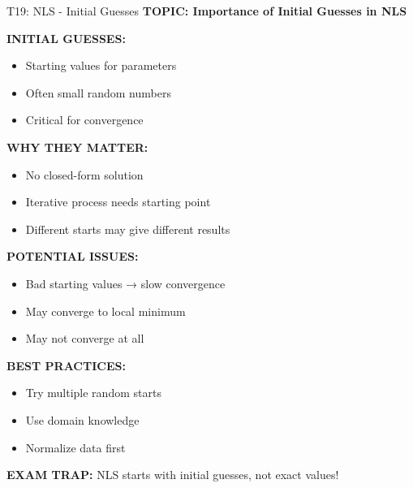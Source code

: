 \documentclass[8pt]{beamer}
\begin{document}
	\begin{frame}{T19: NLS - Initial Guesses}
		\fontsize{6.5}{7.5}\selectfont
		\textbf{TOPIC: Importance of Initial Guesses in NLS}
		
		\vspace{0.1cm}
		\textbf{INITIAL GUESSES:}
		\begin{itemize}
			\item Starting values for parameters
			\item Often small random numbers
			\item Critical for convergence
		\end{itemize}
		
		\vspace{0.1cm}
		\textbf{WHY THEY MATTER:}
		\begin{itemize}
			\item No closed-form solution
			\item Iterative process needs starting point
			\item Different starts may give different results
		\end{itemize}
		
		\vspace{0.1cm}
		\textbf{POTENTIAL ISSUES:}
		\begin{itemize}
			\item Bad starting values → slow convergence
			\item May converge to local minimum
			\item May not converge at all
		\end{itemize}
		
		\vspace{0.1cm}
		\textbf{BEST PRACTICES:}
		\begin{itemize}
			\item Try multiple random starts
			\item Use domain knowledge
			\item Normalize data first
		\end{itemize}
		
		\textcolor{myred}{\textbf{EXAM TRAP:}} NLS starts with \textcolor{myblue}{initial guesses}, not exact values!
	\end{frame}
	
\end{document}
